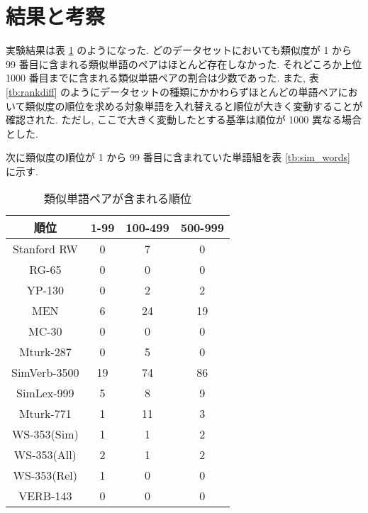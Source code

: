 \documentclass[twocolumn]{jarticle}     %
\begin{document}
\section{結果と考察}
実験結果は表 \ref{tb:result} のようになった. 
どのデータセットにおいても類似度が 1 から 99 番目に含まれる類似単語のペアはほとんど存在しなかった. 
それどころか上位 1000 番目までに含まれる類似単語ペアの割合は少数であった. 
また, 表 \ref{tb:rankdiff} のようにデータセットの種類にかかわらずほとんどの単語ペアにおいて類似度の順位を求める対象単語を入れ替えると順位が大きく変動することが確認された. 
ただし, ここで大きく変動したとする基準は順位が 1000 異なる場合とした. 

次に類似度の順位が 1 から 99 番目に含まれていた単語組を表 \ref{tb:sim_words} に示す. 


\begin{table}[th]
  \caption{類似単語ペアが含まれる順位}
  \label{tb:result}
  \begin{tabular}{c|ccc}
    \hline
    順位           & 1-99 & 100-499 & 500-999 \\ \hline
    Stanford RW  & 0    & 7       & 0       \\
    RG-65        & 0    & 0       & 0       \\
    YP-130       & 0    & 2       & 2       \\
    MEN          & 6    & 24      & 19      \\
    MC-30        & 0    & 0       & 0       \\
    Mturk-287    & 0    & 5       & 0       \\
    SimVerb-3500 & 19   & 74      & 86      \\
    SimLex-999   & 5    & 8       & 9       \\
    Mturk-771    & 1    & 11      & 3       \\
    WS-353(Sim)  & 1    & 1       & 2       \\
    WS-353(All)  & 2    & 1       & 2       \\
    WS-353(Rel)  & 1    & 0       & 0       \\
    VERB-143     & 0    & 0       & 0       \\ \hline
  \end{tabular}
\end{table}
\end{document}
